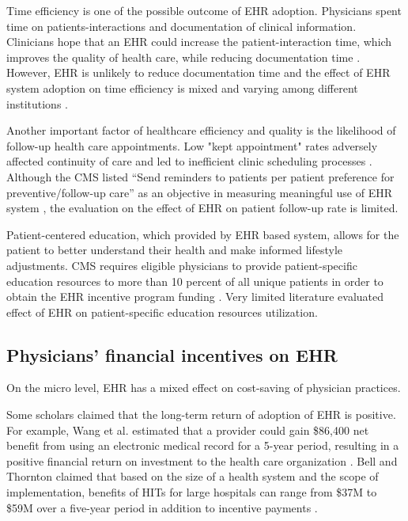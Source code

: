 Time efficiency is one of the possible outcome of EHR adoption. Physicians spent time on patients-interactions and documentation of clinical information. Clinicians hope that an EHR could increase the patient-interaction time, which improves the quality of health care, while reducing documentation time \citep{leung2003incentives}. However, EHR is unlikely to reduce documentation time \citep{poissant2005impact} and the effect of EHR system adoption on time efficiency is mixed and varying among different institutions \citep{Chaudhry2006}.

Another important factor of healthcare efficiency and quality is the likelihood of follow-up health care appointments. Low "kept appointment" rates adversely affected continuity of care and led to inefficient clinic scheduling processes \citep{myers2001strategies}. Although the CMS listed ``Send reminders to patients per patient preference for preventive/follow-up care'' as an objective in measuring meaningful use of EHR system \citep{cmsincentive14}, the evaluation on the effect of EHR on patient follow-up rate is limited.

Patient-centered education, which provided by EHR based system, allows for the patient to better understand their health and make informed lifestyle adjustments. CMS requires eligible physicians to provide patient-specific education resources to more than 10 percent of all unique patients in order to obtain the EHR incentive program funding \citep{healthit05}. Very limited literature evaluated effect of EHR on patient-specific education resources utilization. 

\subsection{Physicians' financial incentives on EHR}
On the micro level, EHR has a mixed effect on cost-saving of physician practices.

Some scholars claimed that the long-term return of adoption of EHR is positive. For example, Wang et al. estimated that a provider could gain \$86,400 net benefit from using an electronic medical record for a 5-year period, resulting in a positive financial return on investment to the health care organization \citep{Wang2003}. Bell and Thornton claimed that based on the size of a health system and the scope of implementation, benefits of HITs for large hospitals can range from \$37M to \$59M over a five-year period in addition to incentive payments \citep{Bell2011}.

